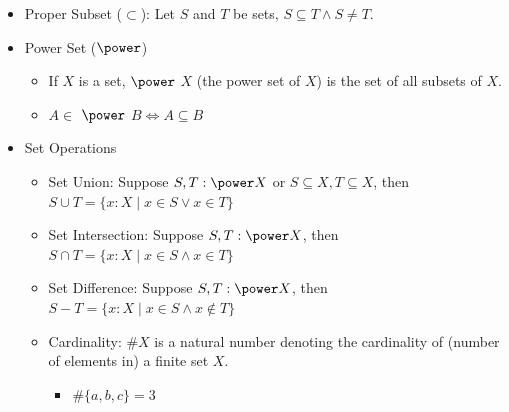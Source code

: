 \documentclass[10pt, landscape]{article}
\begin{document}
\begin{multicols*}{3}
\begin{itemize}
\begin{itemize}
      \item Proper Subset ($\subset$): Let $S$ and $T$ be sets, $S \subseteq T \wedge S \neq T$.
    \item Power Set ($\power$)
    \begin{itemize}
      \item If $X$ is a set, $\power$ $X$ (the power set of $X$) is the set of all subsets of $X$.
      \item $A \in$ $\power$ $B \iff A \subseteq B$ 
    \end{itemize}
    \item Set Operations
    \begin{itemize}
      \item Set Union: Suppose $S, T : \power X$ or $S \subseteq X, T \subseteq X$, then $S \cup T = \{x : X \mid x \in S \vee x \in T\}$
      \item Set Intersection: Suppose $S, T : \power X$, then $S \cap T = \{x : X \mid x \in S \wedge x \in T\}$ 
      \item Set Difference: Suppose $S, T : \power X$, then $S - T = \{x : X \mid x \in S \wedge x \not \in T\}$ 
      \item Cardinality: $\#X$ is a natural number denoting the cardinality of (number of elements in) a finite set $X$.
      \begin{itemize}
          \item $\#\{a, b, c\} = 3$
      \end{itemize}
    \end{itemize}
    \end{itemize}
  \end{itemize}

\end{multicols*}
\end{document}
